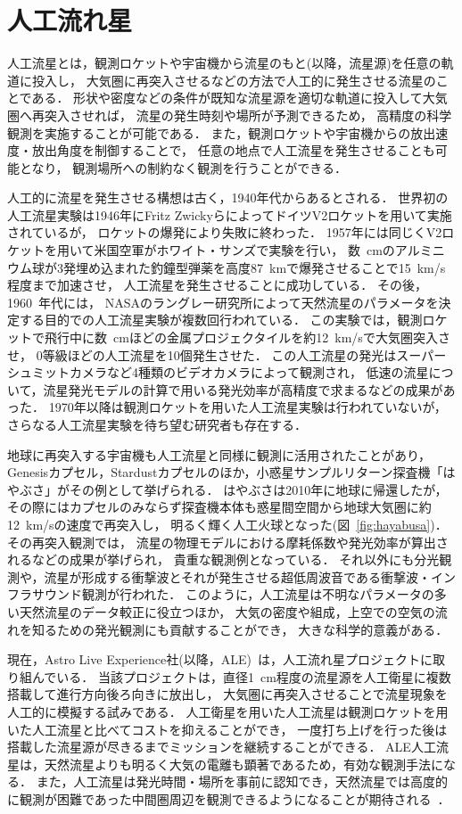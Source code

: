 \section{人工流れ星}

人工流星とは，観測ロケットや宇宙機から流星のもと(以降，流星源)を任意の軌道に投入し，
大気圏に再突入させるなどの方法で人工的に発生させる流星のことである．
形状や密度などの条件が既知な流星源を適切な軌道に投入して大気圏へ再突入させれば，
流星の発生時刻や場所が予測できるため，
高精度の科学観測を実施することが可能である．
また，観測ロケットや宇宙機からの放出速度・放出角度を制御することで，
任意の地点で人工流星を発生させることも可能となり，
観測場所への制約なく観測を行うことができる．

人工的に流星を発生させる構想は古く，1940年代からあるとされる．
世界初の人工流星実験は1946年にFritz ZwickyらによってドイツV2ロケットを用いて実施されているが，
ロケットの爆発により失敗に終わった．
1957年には同じくV2ロケットを用いて米国空軍がホワイト・サンズで実験を行い，
数~cmのアルミニウム球が3発埋め込まれた釣鐘型弾薬を高度87~kmで爆発させることで15~km/s程度まで加速させ，
人工流星を発生させることに成功している．
その後，1960~年代には，
NASAのラングレー研究所によって天然流星のパラメータを決定する目的での人工流星実験が複数回行われている．
この実験では，観測ロケットで飛行中に数~cmほどの金属プロジェクタイルを約12~km/sで大気圏突入させ，
0等級ほどの人工流星を10個発生させた．
この人工流星の発光はスーパーシュミットカメラなど4種類のビデオカメラによって観測され，
低速の流星について，流星発光モデルの計算で用いる発光効率が高精度で求まるなどの成果があった．
1970年以降は観測ロケットを用いた人工流星実験は行われていないが，
さらなる人工流星実験を待ち望む研究者も存在する．

地球に再突入する宇宙機も人工流星と同様に観測に活用されたことがあり，
Genesisカプセル，Stardustカプセルのほか，小惑星サンプルリターン探査機「はやぶさ」がその例として挙げられる．
はやぶさは2010年に地球に帰還したが，
その際にはカプセルのみならず探査機本体も惑星間空間から地球大気圏に約12~km/sの速度で再突入し，
明るく輝く人工火球となった(図~\ref{fig:hayabusa})．
その再突入観測では，
流星の物理モデルにおける摩耗係数や発光効率が算出されるなどの成果が挙げられ，
貴重な観測例となっている．
それ以外にも分光観測や，流星が形成する衝撃波とそれが発生させる超低周波音である衝撃波・インフラサウンド観測が行われた．
このように，人工流星は不明なパラメータの多い天然流星のデータ較正に役立つほか，
大気の密度や組成，上空での空気の流れを知るための発光観測にも貢献することができ，
大きな科学的意義がある．

現在，Astro Live Experience社(以降，ALE)~\cite{ALECoLtd30:online}は，人工流れ星プロジェクトに取り組んでいる．
当該プロジェクトは，直径1~cm程度の流星源を人工衛星に複数搭載して進行方向後ろ向きに放出し，
大気圏に再突入させることで流星現象を人工的に模擬する試みである．
人工衛星を用いた人工流星は観測ロケットを用いた人工流星と比べてコストを抑えることができ，
一度打ち上げを行った後は搭載した流星源が尽きるまでミッションを継続することができる．
ALE人工流星は，天然流星よりも明るく大気の電離も顕著であるため，有効な観測手法になる．
また，人工流星は発光時間・場所を事前に認知でき，天然流星では高度的に観測が困難であった中間圏周辺を観測できるようになることが期待される~\cite{hiraga2017ale}．

